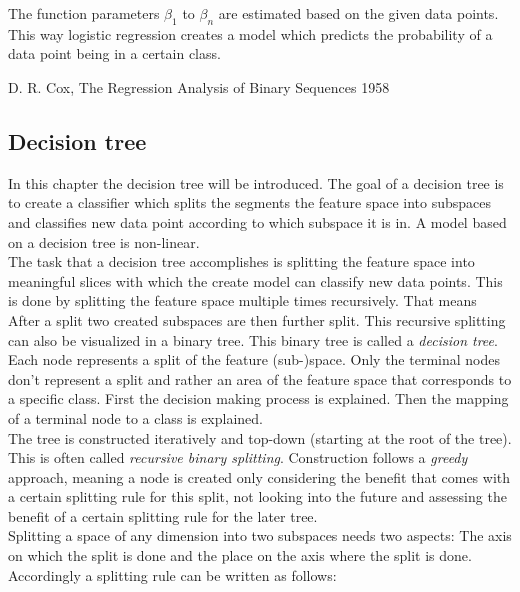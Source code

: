 The function parameters $\beta_1$ to  $\beta_n$ are estimated based on the given data points.  \\
This way logistic regression creates a model which predicts the probability of a data point being in a certain class.


D. R. Cox, The Regression Analysis of Binary Sequences 1958
\subsection{Decision tree}

In this chapter the decision tree will be introduced. The goal of a decision tree is to create a classifier which splits the segments the feature space into subspaces and classifies new data point according to which subspace it is in. A model based on a decision tree is non-linear.
\\

The task that a decision tree accomplishes is splitting the feature space into meaningful slices with which the create model can classify new data points.
This is done by splitting the feature space multiple times recursively. That means After a split two created subspaces are then further split. This recursive splitting can also be visualized in a binary tree. This binary tree is called a \emph{decision tree}. Each node represents a split of the feature (sub-)space.  Only the terminal nodes don't represent a split and rather an area of the feature space that corresponds to a specific class. First the decision making process is explained. Then the mapping of a terminal node to a class is explained.
\\
The tree is constructed iteratively and top-down (starting at the root of the tree). This is often called \emph{recursive binary splitting}. Construction follows a \emph{greedy} approach, meaning a node is created only considering the benefit that comes with a certain splitting rule for this split, not looking into the future and assessing the benefit of a certain splitting rule for the later tree.
\\
Splitting a space of any dimension into two subspaces needs two aspects: The axis on which the split is done and the place on the axis where the split is done. Accordingly a splitting rule can be written as follows:

